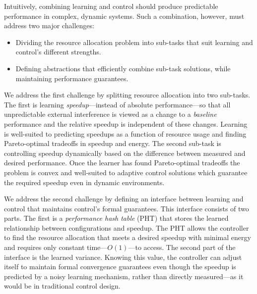 Intuitively, combining learning and control should produce predictable
performance in complex, dynamic systems.  Such a combination, however,
must address two major challenges:
\begin{itemize}[leftmargin=1.5em]
\item Dividing the resource allocation problem into sub-tasks that
  suit learning and control's different strengths.
\item Defining abstractions that efficiently combine sub-task solutions,
  while maintaining performance guarantees.
\end{itemize}

We address the first challenge by splitting resource allocation into
two sub-tasks.  The first is learning \emph{speedup}---instead of
absolute performance---so that all unpredictable external interference
is viewed as a change to a \emph{baseline} performance and the
relative speedup is independent of these changes.  Learning is
well-suited to predicting speedups as a function of resource usage and
finding Pareto-optimal tradeoffs in speedup and energy.  The second
sub-task is controlling speedup dynamically based on the difference
between measured and desired performance.  Once the learner has found
Pareto-optimal tradeoffs the problem is convex and well-suited to
adaptive control solutions which guarantee the required speedup even in
dynamic environments.

We address the second challenge by defining an interface between
learning and control that maintains control's formal guarantees.  This
interface consists of two parts.  The first is a \emph{performance
  hash table} (PHT) that stores the learned relationship between
configurations and speedup.  The PHT allows the controller to find the
resource allocation that meets a desired speedup with minimal energy
and requires only constant time---$O(1)$---to access.  The second part
of the interface is the learned variance.  Knowing this value, the
controller can adjust itself to maintain formal convergence guarantees
even though the speedup is predicted by a noisy learning mechanism,
rather than directly measured---as it would be in traditional control
design.

